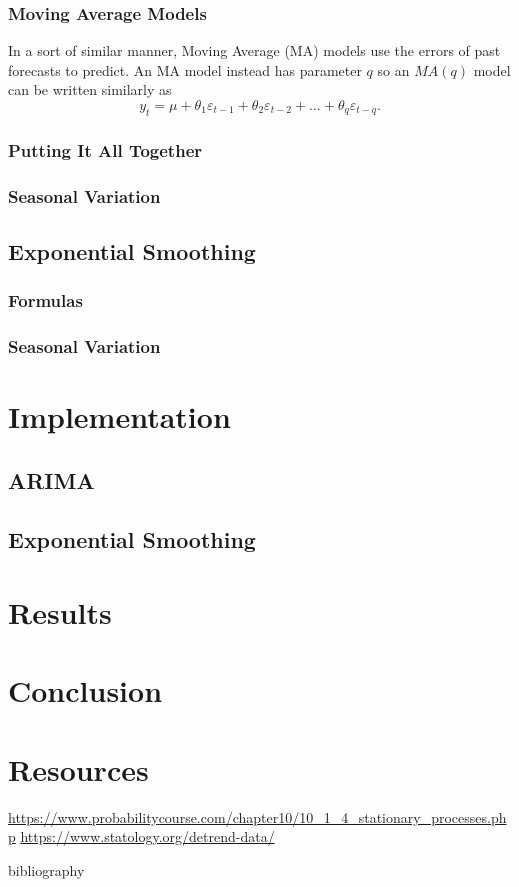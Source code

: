 \documentclass{article}
\begin{document}
  \subsubsection{Moving Average Models}
    In a sort of similar manner, Moving Average (MA) models use the errors of past forecasts to predict. An MA model instead has parameter $q$ so an $MA(q)$ model can be written similarly as
    \begin{equation}
      y_t = \mu + \theta_1 \varepsilon_{t-1} + \theta_2 \varepsilon_{t-2} + ... + \theta_q \varepsilon_{t-q}.
    \end{equation}
  \subsubsection{Putting It All Together}
  \subsubsection{Seasonal Variation}
  \subsection{Exponential Smoothing}
  \subsubsection{Formulas}
  \subsubsection{Seasonal Variation}

  \section{Implementation}
  \subsection{ARIMA}
  \subsection{Exponential Smoothing}

  \section{Results}

  \section{Conclusion}

  \section{Resources}
  \url{https://www.probabilitycourse.com/chapter10/10_1_4_stationary_processes.php}
  \url{https://www.statology.org/detrend-data/}

  bibliography\cite{articleFactCheck}
  \printbibliography
\end{document}
